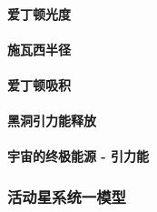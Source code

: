 \paragraph{爱丁顿光度}

\paragraph{施瓦西半径}

\paragraph{爱丁顿吸积}

\paragraph{黑洞引力能释放}

\paragraph{宇宙的终极能源 - 引力能}

\subsubsection{活动星系统一模型}
